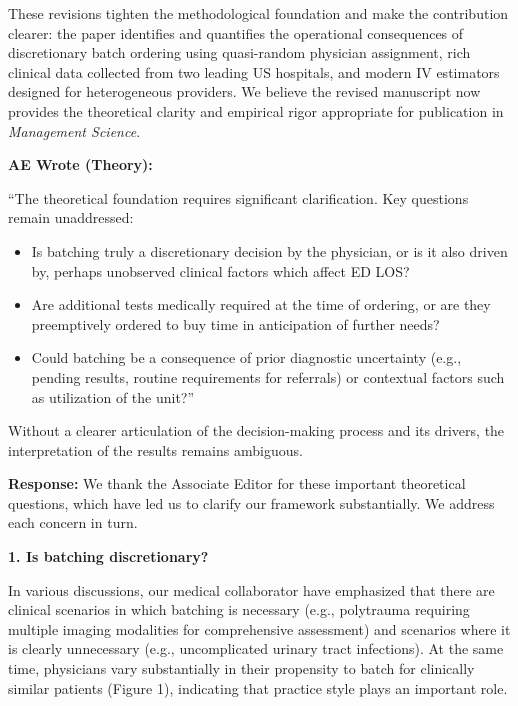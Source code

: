 \documentclass[11pt]{article}
\newenvironment{quote2}
{ \bigskip
\noindent
         \small\em
         \baselineskip=14pt
}
\newcommand{\1}{\hbox{\rm 1\kern-.35em 1}}
\begin{document}
These revisions tighten the methodological foundation and make the contribution clearer: the paper identifies and quantifies the operational consequences of discretionary batch ordering using quasi-random physician assignment, rich clinical data collected from two leading US hospitals, and modern IV estimators designed for heterogeneous providers. We believe the revised manuscript now provides the theoretical clarity and empirical rigor appropriate for publication in {\em Management Science}.

\color{black}

\begin{quote2}
\textbf{AE Wrote (Theory):}

\noindent ``The theoretical foundation requires significant clarification. Key questions remain unaddressed:
\begin{itemize}
 \item Is batching truly a discretionary decision by the physician, or is it also driven by, perhaps unobserved clinical factors which affect ED LOS?
 \item Are additional tests medically required at the time of ordering, or are they preemptively ordered to buy time in anticipation of further needs?
 \item Could batching be a consequence of prior diagnostic uncertainty (e.g., pending results, routine requirements for referrals) or contextual factors such as utilization of the unit?''
\end{itemize}

Without a clearer articulation of the decision-making process and its drivers, the interpretation of the results remains ambiguous.

\end{quote2}

\noindent\textbf{Response:} \color{blue} We thank the Associate Editor for these important theoretical questions, which have led us to clarify our framework substantially. We address each concern in turn.

\textbf{1. Is batching discretionary?}

In various discussions, our medical collaborator have emphasized that there are clinical scenarios in which batching is necessary (e.g., polytrauma requiring multiple imaging modalities for comprehensive assessment) and scenarios where it is clearly unnecessary (e.g., uncomplicated urinary tract infections). At the same time, physicians vary substantially in their propensity to batch for clinically similar patients (Figure 1), indicating that practice style plays an important role.
\end{document}
